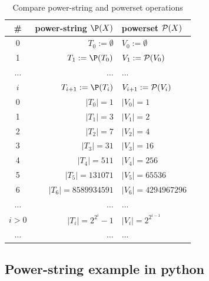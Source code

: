 \begin{appendices}
  \begin{table}[ht]
    \caption{Compare power-string and powerset operations}
    \centering
    \begin{tabular}{ |c|r|l| }
      \hline
      \# & power-string $\P(X)$                & powerset $\mathcal{P}(X)$             \\
      \hline
      0            & $T_0 := \emptyset$        & $V_0 := \emptyset$              \\
      1            & $T_1 := \P(T_0) $         & $V_1 := \mathcal{P}(V_0)$             \\
      $\dots$      & $\dots $                  & $\dots $                        \\
      $i$          & $T_{i+1} := \P(T_i)$      & $V_{i+1} := \mathcal{P}(V_{i})$       \\
      \hline
      0            & $|T_0| = 1$               & $|V_0| = 1$                     \\
      1            & $|T_1| = 3$               & $|V_1| = 2$                     \\
      2            & $|T_2| = 7$               & $|V_2| = 4$                     \\
      3            & $|T_3| = 31$              & $|V_3| = 16$                    \\
      4            & $|T_4| = 511$             & $|V_4| = 256$                   \\
      5            & $|T_5| = 131071$          & $|V_5| = 65536$                 \\
      6            & $|T_6| = 8589934591$      & $|V_6| = 4294967296$            \\
      $\dots$      & $\dots $                  & $\dots $                        \\
      $i>0$        & $|T_i| = 2^{2^{i}} - 1$ & $|V_i| = 2^{2^{i-1}}$             \\
      $\dots$      & $\dots $                  & $\dots $                        \\
      \hline
    \end{tabular}
    \label{Tab:PwrStrVsSet}
  \end{table}
  
  \pagebreak
  \subsection{Power-string example in python}
  


\end{appendices}
